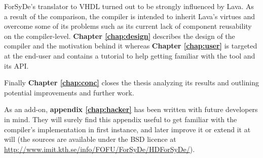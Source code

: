 ForSyDe's translator to VHDL turned out to be strongly influenced by
Lava. As a result of the comparison, the compiler is intended to
inherit Lava's virtues and overcome some of its problems such as its
current lack of component reusability on the
compiler-level. \textbf{Chapter \ref{chap:design}} describes the
design of the compiler and the motivation behind it whereas
\textbf{Chapter \ref{chap:user}} is targeted at the end-user and
contains a tutorial to help getting familiar with the tool and its
API.

Finally \textbf{Chapter \ref{chap:conc}} closes the thesis analyzing
its results and outlining potential improvements and further work.

As an add-on, \textbf{appendix \ref{chap:hacker}} has been written with future
developers in mind. They will surely find this appendix useful to get
familiar with the compiler's implementation in first instance, and
later improve it or extend it at will (the sources are available under
the BSD licence at
\url{http://www.imit.kth.se/info/FOFU/ForSyDe/HDForSyDe/}).
